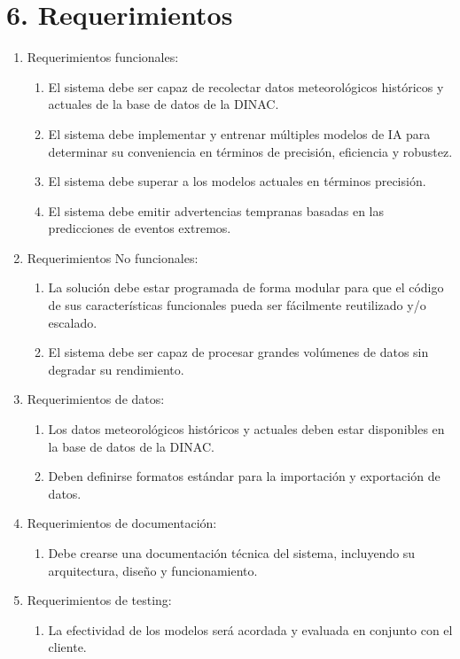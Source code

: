 \documentclass[
11pt, %
codirector, %
]{charter}
\begin{document}
\section{6. Requerimientos}
\label{sec:requerimientos}

\begin{enumerate}
	\item Requerimientos funcionales:
		\begin{enumerate}
			\item El sistema debe ser capaz de recolectar datos meteorológicos históricos y actuales de la base de datos de la DINAC.
			\item El sistema debe implementar y entrenar múltiples modelos de IA para determinar su conveniencia en términos de precisión, eficiencia y robustez.
			\item El sistema debe superar a los modelos actuales en términos precisión.
			\item El sistema debe emitir advertencias tempranas basadas en las predicciones de eventos extremos.
		\end{enumerate}
	\item Requerimientos No funcionales:
		\begin {enumerate}
			\item La solución debe estar programada de forma modular para que el código de sus características funcionales pueda ser fácilmente reutilizado y/o escalado.
			\item El sistema debe ser capaz de procesar grandes volúmenes de datos sin degradar su rendimiento.
		\end{enumerate}
	\item Requerimientos de datos:
		\begin {enumerate}
			\item Los datos meteorológicos históricos y actuales deben estar disponibles en la base de datos de la DINAC.
			\item Deben definirse formatos estándar para la importación y exportación de datos.
		\end{enumerate}
	\item Requerimientos de documentación:
		\begin{enumerate}
			\item Debe crearse una documentación técnica del sistema, incluyendo su arquitectura, diseño y funcionamiento.
		\end{enumerate}
	\item Requerimientos de testing:
		\begin{enumerate}
			\item La efectividad de los modelos será acordada y evaluada en conjunto con el cliente.
		\end{enumerate}
\end{enumerate}
\end{document}
